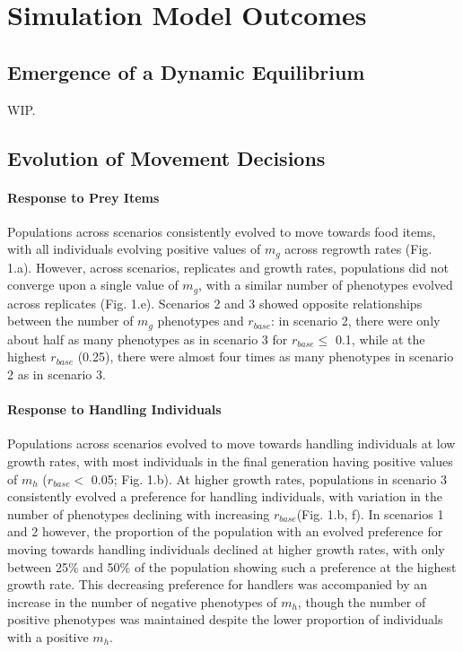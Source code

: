 \documentclass[11pt]{article}
\begin{document}
\section*{Simulation Model Outcomes}

\subsection*{Emergence of a Dynamic Equilibrium}

WIP.

\subsection*{Evolution of Movement Decisions}

\paragraph*{Response to Prey Items}

Populations across scenarios consistently evolved to move towards food items, with all individuals evolving positive values of $m_g$ across regrowth rates (Fig. 1.a).
However, across scenarios, replicates and growth rates, populations did not converge upon a single value of $m_g$, with a similar number of phenotypes evolved across replicates (Fig. 1.e).
Scenarios 2 and 3 showed opposite relationships between the number of $m_g$ phenotypes and $r_{base}$: in scenario 2, there were only about half as many phenotypes as in scenario 3 for $r_{base} \leq$ 0.1, while at the highest $r_{base}$ (0.25), there were almost four times as many phenotypes in scenario 2 as in scenario 3.

\paragraph*{Response to Handling Individuals}

Populations across scenarios evolved to move towards handling individuals at low growth rates, with most individuals in the final generation having positive values of $m_h$ ($r_{base} <$ 0.05; Fig. 1.b).
At higher growth rates, populations in scenario 3 consistently evolved a preference for handling individuals, with variation in the number of phenotypes declining with increasing $r_{base} $(Fig. 1.b, f).
In scenarios 1 and 2 however, the proportion of the population with an evolved preference for moving towards handling individuals declined at higher growth rates, with only between 25\% and 50\% of the population showing such a preference at the highest growth rate.
This decreasing preference for handlers was accompanied by an increase in the number of negative phenotypes of $m_h$, though the number of positive phenotypes was maintained despite the lower proportion of individuals with a positive $m_h$.
\end{document}
